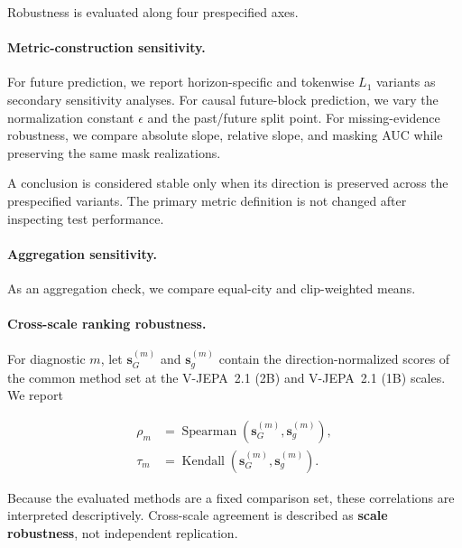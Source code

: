 Robustness is evaluated along four prespecified axes.

\paragraph{Metric-construction sensitivity.}
For future prediction, we report horizon-specific and tokenwise
$L_1$ variants as secondary sensitivity analyses. For causal
future-block prediction, we vary the normalization constant
\(\epsilon\) and the past/future split point. For
missing-evidence robustness, we compare absolute slope, relative slope,
and masking AUC while preserving the same mask realizations.

A conclusion is considered stable only when its direction is preserved
across the prespecified variants. The primary metric definition is not
changed after inspecting test performance.

\paragraph{Aggregation sensitivity.}
As an aggregation check, we compare equal-city and clip-weighted means.

\paragraph{Cross-scale ranking robustness.}
For diagnostic \(m\), let
\(\mathbf s_G^{(m)}\) and \(\mathbf s_g^{(m)}\) contain the
direction-normalized scores of the common method set at the V-JEPA~2.1 (2B) and
V-JEPA~2.1 (1B) scales. We report

\begin{equation*}
\begin{aligned}
\rho_m
&=
\operatorname{Spearman}
\left(
\mathbf s_G^{(m)},
\mathbf s_g^{(m)}
\right),
\\
\tau_m
&=
\operatorname{Kendall}
\left(
\mathbf s_G^{(m)},
\mathbf s_g^{(m)}
\right).
\end{aligned}
\end{equation*}

Because the evaluated methods are a fixed comparison set, these
correlations are interpreted descriptively. Cross-scale agreement is
described as \textbf{scale robustness}, not independent replication.

